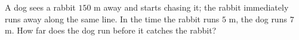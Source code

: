A dog sees a rabbit $150$ m away and starts chasing it; the rabbit immediately runs away along the same line. In the time the rabbit runs $5$ m, the dog runs $7$ m. How far does the dog run before it catches the rabbit?
